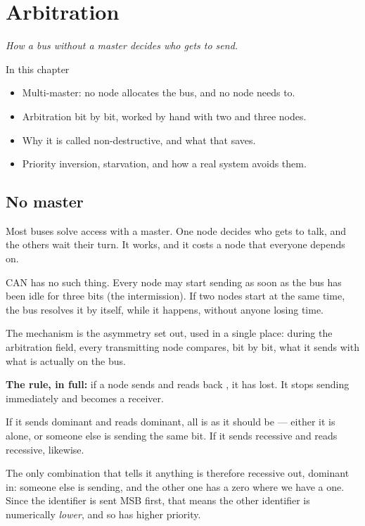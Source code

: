 \chapter{Arbitration}
\label{ch:arbitrering}

{\large\itshape How a bus without a master decides who gets to send.\par}

\begin{chapterbox}{In this chapter}
\begin{itemize}
  \item Multi-master: no node allocates the bus, and no node needs to.
  \item Arbitration bit by bit, worked by hand with two and three nodes.
  \item Why it is called non-destructive, and what that saves.
  \item Priority inversion, starvation, and how a real system avoids them.
\end{itemize}
\end{chapterbox}

\section{No master}

Most buses solve access with a master. One node decides who gets to talk, and the others wait
their turn. It works, and it costs a node that everyone depends on.

CAN has no such thing. Every node may start sending as soon as the bus has been idle for three bits
(the intermission). If two nodes start at the same time, the bus resolves it by itself, while it
happens, without anyone losing time.

The mechanism is the asymmetry  set out, used in a single place: during the
arbitration field, every transmitting node compares, bit by bit, what it sends with what is
actually on the bus.

\begin{aside}
\textbf{The rule, in full:} if a node sends \rec{} and reads back \dom{}, it has lost. It stops
sending immediately and becomes a receiver.
\end{aside}

If it sends dominant and reads dominant, all is as it should be --- either it is alone, or someone
else is sending the same bit. If it sends recessive and reads recessive, likewise.

The only combination that tells it anything is therefore recessive out, dominant in: someone else
is sending, and the other one has a zero where we have a one. Since the identifier is sent MSB
first, that means the other identifier is numerically \emph{lower}, and so has higher priority.

